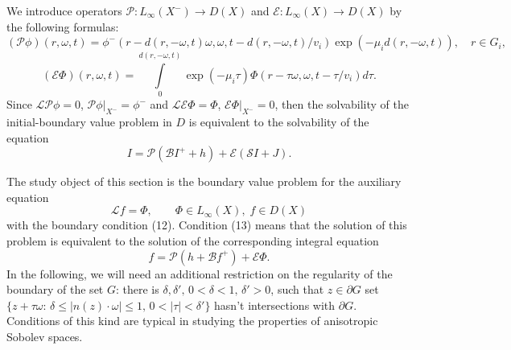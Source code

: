 \documentclass[12pt,reqno]{report}
\begin{document}
We introduce operators $\mathcal P: L_{\infty}(X^-) \to D(X)$ and $\mathcal E:  L_{\infty}(X) \to D(X)$ by the following formulas:
$$
(\mathcal P
\phi)(r,\omega,t)=\phi^-(r-d(r,-\omega,t)\omega,\omega,t-d(r,-\omega,t)/v_i)
\exp \left(- \mu_i d(r,-\omega,t)\right), \quad
r\in G_i,
$$
$$
(\mathcal E\Phi)(r,\omega,t)=\int \limits^{d(r,-\omega,t)}_0 \exp
\left(- \mu_i \tau\right) \Phi(r-\tau
\omega,\omega,t-\tau/v_i)d\tau.
$$
Since ${\mathcal L} {\mathcal P} \phi =0$, ${\mathcal P}
\phi|_{X^-} =\phi^-$ and ${\mathcal L} {\mathcal E} \Phi = \Phi$,
${\mathcal E} \Phi|_{X^-}=0$, then the solvability of the initial-boundary value problem 
in $D$ is equivalent to the solvability of the equation
\begin{equation}
I= \mathcal P(\mathcal B I^+ +h ) + \mathcal E ( \mathcal S I +
J).
\end{equation}

The study object of this section is the boundary value problem for the auxiliary equation
\begin{equation}
\mathcal Lf =\Phi, \qquad \Phi \in L_{\infty}(X), \; f \in D(X)
\end{equation}
with the boundary condition (12). 
Condition (13) means that the solution of this problem is equivalent to the solution of the corresponding integral equation 
\begin{equation}
f= \mathcal P (h+\mathcal B f^+) +{\mathcal E}\Phi.
\end{equation}
In the following, we will need an additional restriction on the regularity of the boundary of the set $G$: 
there is $\delta,\delta',\, 0< \delta < 1,\, \delta'>0$, such that $z \in \partial G$ set 
$\{z+\tau\omega:\, \delta \leq |n(z)\cdot \omega| \leq 1,\, 0 <|\tau| <\delta'\}$ hasn't intersections with $\partial G$. 
Conditions of this kind are typical in studying the properties of anisotropic Sobolev spaces.
\end{document}
